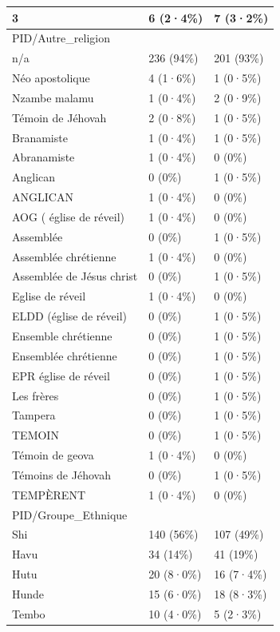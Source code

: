 \documentclass[
]{book}
\begin{document}
\begin{tabular}{l|l|l}
\hline
3 & 6 (2·4\%) & 7 (3·2\%)\\
\hline
PID/Autre\_religion &  & \\
\hline
n/a & 236 (94\%) & 201 (93\%)\\
\hline
Néo apostolique & 4 (1·6\%) & 1 (0·5\%)\\
\hline
Nzambe malamu & 1 (0·4\%) & 2 (0·9\%)\\
\hline
Témoin de Jéhovah & 2 (0·8\%) & 1 (0·5\%)\\
\hline
Branamiste & 1 (0·4\%) & 1 (0·5\%)\\
\hline
Abranamiste & 1 (0·4\%) & 0 (0\%)\\
\hline
Anglican & 0 (0\%) & 1 (0·5\%)\\
\hline
ANGLICAN & 1 (0·4\%) & 0 (0\%)\\
\hline
AOG  ( église de réveil) & 1 (0·4\%) & 0 (0\%)\\
\hline
Assemblée & 0 (0\%) & 1 (0·5\%)\\
\hline
Assemblée chrétienne & 1 (0·4\%) & 0 (0\%)\\
\hline
Assemblée de Jésus christ & 0 (0\%) & 1 (0·5\%)\\
\hline
Eglise de réveil & 1 (0·4\%) & 0 (0\%)\\
\hline
ELDD (église de réveil) & 0 (0\%) & 1 (0·5\%)\\
\hline
Ensemble chrétienne & 0 (0\%) & 1 (0·5\%)\\
\hline
Ensemblée chrétienne & 0 (0\%) & 1 (0·5\%)\\
\hline
EPR église de réveil & 0 (0\%) & 1 (0·5\%)\\
\hline
Les frères & 0 (0\%) & 1 (0·5\%)\\
\hline
Tampera & 0 (0\%) & 1 (0·5\%)\\
\hline
TEMOIN & 0 (0\%) & 1 (0·5\%)\\
\hline
Témoin de geova & 1 (0·4\%) & 0 (0\%)\\
\hline
Témoins de Jéhovah & 0 (0\%) & 1 (0·5\%)\\
\hline
TEMPÈRENT & 1 (0·4\%) & 0 (0\%)\\
\hline
PID/Groupe\_Ethnique &  & \\
\hline
Shi & 140 (56\%) & 107 (49\%)\\
\hline
Havu & 34 (14\%) & 41 (19\%)\\
\hline
Hutu & 20 (8·0\%) & 16 (7·4\%)\\
\hline
Hunde & 15 (6·0\%) & 18 (8·3\%)\\
\hline
Tembo & 10 (4·0\%) & 5 (2·3\%)\\

\end{tabular}
\end{document}
